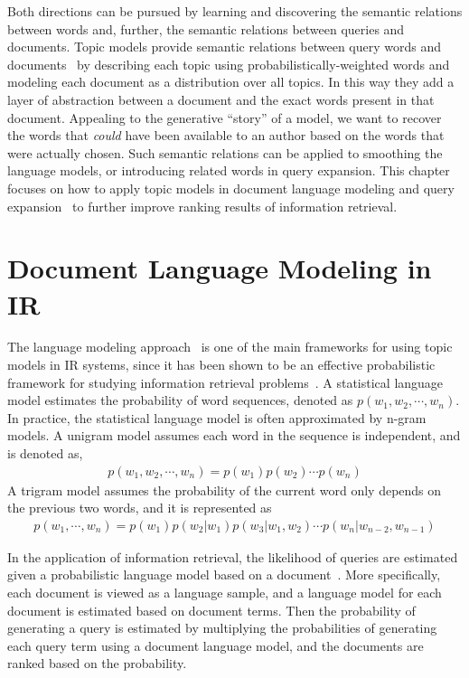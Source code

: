 Both directions can be pursued by learning and discovering the
semantic relations between words and, further, the semantic relations
between queries and documents. Topic models provide semantic relations between query words and
documents~\citep{deerwester-90,hofmann-99a} by describing each topic
using probabilistically-weighted words and modeling each document as a distribution over
all topics.
In this way they add a layer of abstraction between a document and the exact words present in that document.
Appealing to the generative ``story'' of a model, we want to recover the words that {\em could} have been available to an author based on the words that were actually chosen.
Such semantic relations
can be applied to smoothing the language models, or introducing
related words in query expansion. This chapter focuses on how to apply
topic models in document language modeling \citep{Lu-2011,wei-06} and
query expansion~\citep{Park-2009,Andrzejewski-2011} to further improve
 ranking results of information retrieval.

\section{Document Language Modeling in IR}
\label{sec:ir-lm}

The language modeling approach~\citep{croft-03,PonteCroft,song-99} is
one of the main frameworks for using topic models in IR systems, since
it has been shown to be an effective probabilistic framework for studying
information retrieval problems~\citep{PonteCroft,berger-99}.
A statistical language model estimates the probability of word
sequences, denoted as $p(w_1,w_2,\cdots,w_n)$. In practice, the
statistical language model is often approximated by n-gram models. A
unigram model assumes each word in the sequence is independent, and is
denoted as,
\begin{align}
p(w_1,w_2,\cdots,w_n) = p(w_1)p(w_2) \cdots p(w_n)
\end{align}
A trigram model assumes the probability of the current word only
depends on the previous two words, and it is represented as
\begin{align}
p(w_1,\cdots,w_n)=p(w_1)p(w_2|w_1)p(w_3|w_1,w_2)\cdots p(w_n|w_{n-2},w_{n-1})
\end{align}

In the application of information retrieval, the likelihood of queries
are estimated given a probabilistic language model based on a
document~\citep{zhai-01}. More specifically, each document is viewed
as a language sample, and a language model for each document is
estimated based on document terms. Then the
probability of generating a query is estimated by multiplying the probabilities of
generating each query term using a document language model,
and the documents are ranked based on the probability.

